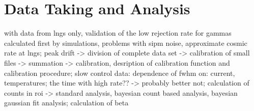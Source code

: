 \chapter{Data Taking and Analysis}
\label{chap:DataAnalysis}

with data from lngs only, validation of the low rejection rate for gammas calculated first by simulations, problems with sipm noise, approximate cosmic rate at lngs; peak drift -> division of complete data set -> calibration of small files -> summation -> calibration, desription of calibration function and calibration procedure; slow control data: dependence of fwhm on: current, temperatures; the time with high rate?? -> probably better not; calculation of counts in roi -> standard analysis, bayesian count based analysis, bayesian gaussian fit analysis; calculation of beta